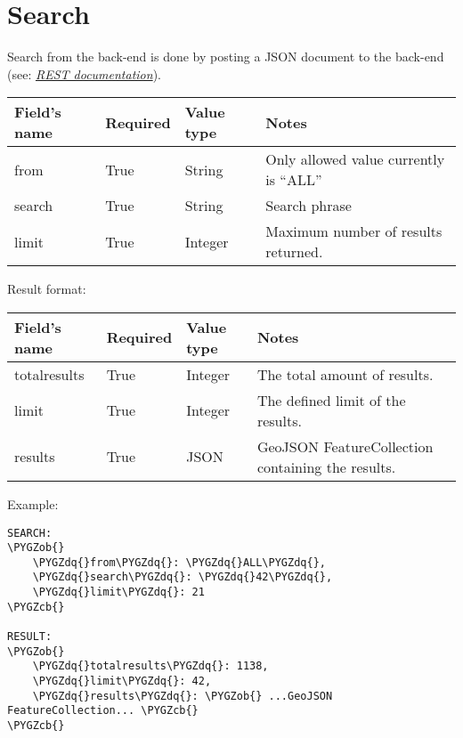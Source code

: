 \documentclass[letterpaper,10pt,english]{sphinxmanual}
\def\PYGZob{\char`\{}
\def\PYGZcb{\char`\}}
\def\PYGZdq{\char`\"}
\begin{document}
\section{Search}
\label{json/search:searchjson}\label{json/search:search}\label{json/search::doc}
Search from the back-end is done by posting a JSON document to the back-end (see:
{\hyperref[restdoc:locationrest]{\emph{REST documentation}}}).

\begin{tabulary}{\linewidth}{|L|L|L|L|}
\hline
\textsf{\relax 
Field's name
} & \textsf{\relax 
Required
} & \textsf{\relax 
Value type
} & \textsf{\relax 
Notes
}\\
\hline
from
 & 
True
 & 
String
 & 
Only allowed value currently is ``ALL''
\\

search
 & 
True
 & 
String
 & 
Search phrase
\\

limit
 & 
True
 & 
Integer
 & 
Maximum number of results returned.
\\
\hline\end{tabulary}


Result format:

\begin{tabulary}{\linewidth}{|L|L|L|L|}
\hline
\textsf{\relax 
Field's name
} & \textsf{\relax 
Required
} & \textsf{\relax 
Value type
} & \textsf{\relax 
Notes
}\\
\hline
totalresults
 & 
True
 & 
Integer
 & 
The total amount of results.
\\

limit
 & 
True
 & 
Integer
 & 
The defined limit of the results.
\\

results
 & 
True
 & 
JSON
 & 
GeoJSON FeatureCollection containing the results.
\\
\hline\end{tabulary}


Example:

\begin{Verbatim}[commandchars=\\\{\}]
SEARCH:
\PYGZob{}
    \PYGZdq{}from\PYGZdq{}: \PYGZdq{}ALL\PYGZdq{},
    \PYGZdq{}search\PYGZdq{}: \PYGZdq{}42\PYGZdq{},
    \PYGZdq{}limit\PYGZdq{}: 21
\PYGZcb{}

RESULT:
\PYGZob{}
    \PYGZdq{}totalresults\PYGZdq{}: 1138,
    \PYGZdq{}limit\PYGZdq{}: 42,
    \PYGZdq{}results\PYGZdq{}: \PYGZob{} ...GeoJSON FeatureCollection... \PYGZcb{}
\PYGZcb{}
\end{Verbatim}
\end{document}

